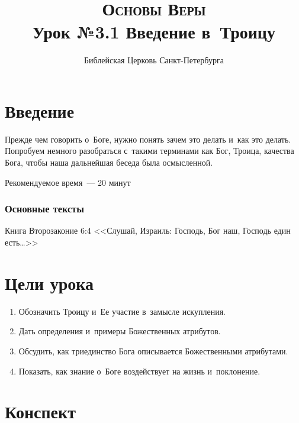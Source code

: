 \documentclass[a4paper,12pt]{article}
\title{\textsc{Основы Веры}\\Урок №3.1 Введение в~Троицу}
\author{Библейская Церковь Санкт-Петербурга}
\date{}
\begin{document}
\maketitle

\thispagestyle{empty}

\tableofcontents

\newcommand{\myline}{\noindent\makebox[\linewidth]{\rule{\linewidth}{0.1pt}}}


\section*{Введение}
Прежде чем говорить о~Боге, нужно понять зачем это делать и~как это делать. Попробуем немного разобраться с~такими терминами как Бог, Троица, качества Бога, чтобы наша дальнейшая беседа была осмысленной.

Рекомендуемое время~--- 20 минут
        
\subsubsection*{Основные тексты}

Книга Второзаконие 6:4 
<<Слушай, Израиль: Господь, Бог наш, Господь един есть\ldots>>
    

\section*{Цели урока}
\begin{enumerate}
    \item Обозначить Троицу и~Ее участие в~замысле искупления.
    \item Дать определения и~примеры Божественных атрибутов.
    \item Обсудить, как триединство Бога описывается Божественными атрибутами.
    \item Показать, как знание о~Боге воздействует на жизнь и~поклонение.
\end{enumerate}

\section*{Конспект}
\end{document}
